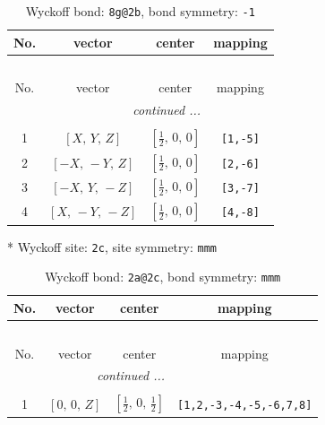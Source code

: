 \documentclass[fleqn,8pt]{jsarticle}
\begin{document}
\begin{longtable}{cccc}
\caption{Wyckoff bond: {\tt 8g@2b}, bond symmetry: {\tt -1}}
 \\
 \hline \hline
No. & vector & center & mapping \\ \hline \endfirsthead

\multicolumn{3}{l}{\tablename\ \thetable{}} \\
 \hline \hline
No. & vector & center & mapping \\ \hline \endhead

 \hline \hline
\multicolumn{3}{r}{\footnotesize\it continued ...} \\ \endfoot

 \hline \hline
\multicolumn{3}{r}{} \\ \endlastfoot

1 & $\left[ X,\, Y,\, Z \right]$ & $\left[ \frac{1}{2},\, 0,\, 0 \right]$ & {\tt [1,-5]} \\ \hline
2 & $\left[ - X,\, - Y,\, Z \right]$ & $\left[ \frac{1}{2},\, 0,\, 0 \right]$ & {\tt [2,-6]} \\ \hline
3 & $\left[ - X,\, Y,\, - Z \right]$ & $\left[ \frac{1}{2},\, 0,\, 0 \right]$ & {\tt [3,-7]} \\ \hline
4 & $\left[ X,\, - Y,\, - Z \right]$ & $\left[ \frac{1}{2},\, 0,\, 0 \right]$ & {\tt [4,-8]} \\
\end{longtable}
* Wyckoff site: {\tt 2c}, site symmetry: {\tt mmm}
\renewcommand{\arraystretch}{1.2}
\begin{longtable}{cccc}
\caption{Wyckoff bond: {\tt 2a@2c}, bond symmetry: {\tt mmm}}
 \\
 \hline \hline
No. & vector & center & mapping \\ \hline \endfirsthead

\multicolumn{3}{l}{\tablename\ \thetable{}} \\
 \hline \hline
No. & vector & center & mapping \\ \hline \endhead

 \hline \hline
\multicolumn{3}{r}{\footnotesize\it continued ...} \\ \endfoot

 \hline \hline
\multicolumn{3}{r}{} \\ \endlastfoot

1 & $\left[ 0,\, 0,\, Z \right]$ & $\left[ \frac{1}{2},\, 0,\, \frac{1}{2} \right]$ & {\tt [1,2,-3,-4,-5,-6,7,8]} \\
\end{longtable}
\end{document}
